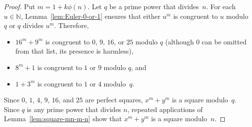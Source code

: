 \documentclass[12pt]{article}
\newcommand{\bZ}{\mathbb{Z}}
\newcommand{\bN}{\mathbb{N}} %
\theoremstyle{definition}
\begin{document}
  \begin{proof}
    Put $m = 1 + k \phi(n)$.
    Let $q$ be a prime power that divides~$n$.
    For each $u \in \bN$, 
    Lemma~\ref{lem:Euler-0-or-1} ensures that either $u^m$ is congruent to $u$ modulo $q$ or $q$ divides $u^m$.
    Therefore, 
    \begin{itemize}
    \item $16^m + 9^m$ is congruent to $0$, $9$, $16$, or $25$ modulo $q$
      (although $0$ can be omitted from that list, its presence is harmless),
      \item $8^m + 1$ is congruent to $1$ or $9$ modulo $q$, and 
      \item $1 + 3^m$ is congruent to $1$ or $4$ modulo~$q$.
      \end{itemize}
      Since $0$, $1$, $4$, $9$, $16$, and $25$ are perfect squares,
      $x^m + y^m$ is a square modulo~$q$.
      Since $q$ is any prime power that divides $n$,
      repeated applications of Lemma~\ref{lem:square-mn-m-n}
      show that $x^m + y^m$ is a square modulo~$n$.
    \end{proof}




\end{document}
